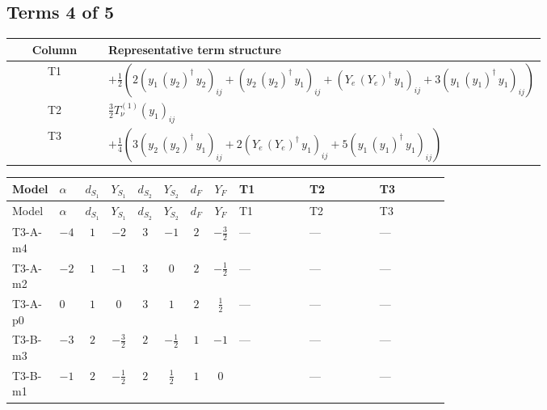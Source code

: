 \documentclass[8pt]{article}
\begin{document}
\begin{landscape}
\subsection*{Terms 4 of 5}
\begin{center}
\begin{tabular}{@{}c >{\raggedright\arraybackslash}p{0.82\linewidth}@{}}
\toprule
Column & Representative term structure \\
\midrule
T1 & \(\displaystyle +\frac{1}{2} (2 \left({y_1}\,\left({y_2}\right)^{\dagger}\,{y_2}\right)_{ij}+\left({y_2}\,\left({y_2}\right)^{\dagger}\,{y_1}\right)_{ij}+\left({Y_e}\,\left({Y_e}\right)^{\dagger}\,{y_1}\right)_{ij}+3 \left({y_1}\,\left({y_1}\right)^{\dagger}\,{y_1}\right)_{ij})\) \\
\midrule
T2 & \(\displaystyle \frac{3}{2} T_{\nu}^{(1)} \left({y_1}\right)_{ij}\) \\
\midrule
T3 & \(\displaystyle +\frac{1}{4} (3 \left({y_2}\,\left({y_2}\right)^{\dagger}\,{y_1}\right)_{ij}+2 \left({Y_e}\,\left({Y_e}\right)^{\dagger}\,{y_1}\right)_{ij}+5 \left({y_1}\,\left({y_1}\right)^{\dagger}\,{y_1}\right)_{ij})\) \\
\midrule
\bottomrule
\end{tabular}
\end{center}
\smallskip
\tiny
\begin{longtable}{@{}llcccccc >{\raggedright\arraybackslash}p{0.21\linewidth} >{\raggedright\arraybackslash}p{0.21\linewidth} >{\raggedright\arraybackslash}p{0.21\linewidth}@{}}
\toprule
Model & $\alpha$ & $d_{S_1}$ & $Y_{S_1}$ & $d_{S_2}$ & $Y_{S_2}$ & $d_F$ & $Y_F$ & T1 & T2 & T3 \\
\midrule
\endfirsthead
\toprule
Model & $\alpha$ & $d_{S_1}$ & $Y_{S_1}$ & $d_{S_2}$ & $Y_{S_2}$ & $d_F$ & $Y_F$ & T1 & T2 & T3 \\
\midrule
\endhead
T3-A-m4 & $-4$ & $1$ & $-2$ & $3$ & $-1$ & $2$ & $-\frac{3}{2}$ & --- & --- & --- \\
\midrule
T3-A-m2 & $-2$ & $1$ & $-1$ & $3$ & $0$ & $2$ & $-\frac{1}{2}$ & --- & --- & --- \\
\midrule
T3-A-p0 & $0$ & $1$ & $0$ & $3$ & $1$ & $2$ & $\frac{1}{2}$ & --- & --- & --- \\
\midrule
T3-B-m3 & $-3$ & $2$ & $-\frac{3}{2}$ & $2$ & $-\frac{1}{2}$ & $1$ & $-1$ & --- & --- & --- \\
\midrule
T3-B-m1 & $-1$ & $2$ & $-\frac{1}{2}$ & $2$ & $\frac{1}{2}$ & $1$ & $0$ & \scriptsize\adjustbox{max width=\linewidth}{$\begin{gathered} +\frac{1}{2} (2 \left({y_1}\,\left({y_2}\right)^{\dagger}\,{y_2}\right)_{ij}+\left({y_2}\,\left({y_2}\right)^{\dagger}\,{y_1}\right)_{ij}+\left({Y_e}\,\left({Y_e}\right)^{\dagger}\,{y_1}\right)_{ij}+3 \left({y_1}\,\left({y_1}\right)^{\dagger}\,{y_1}\right)_{ij})\end{gathered}$} & --- & --- \\

\end{longtable}
\end{landscape}
\end{document}
